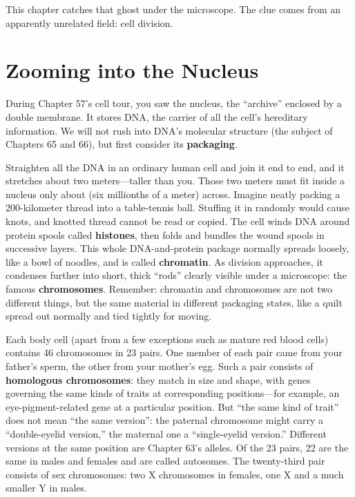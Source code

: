This chapter catches that ghost under the microscope. The clue comes from an apparently unrelated field: cell division.

\section{Zooming into the Nucleus}

During Chapter 57's cell tour, you saw the nucleus, the ``archive'' enclosed by a double membrane. It stores DNA, the carrier of all the cell's hereditary information. We will not rush into DNA's molecular structure (the subject of Chapters 65 and 66), but first consider its \textbf{packaging}.

Straighten all the DNA in an ordinary human cell and join it end to end, and it stretches about two meters---taller than you. Those two meters must fit inside a nucleus only about  (six millionths of a meter) across. Imagine neatly packing a 200-kilometer thread into a table-tennis ball. Stuffing it in randomly would cause knots, and knotted thread cannot be read or copied. The cell winds DNA around protein spools called \textbf{histones}, then folds and bundles the wound spools in successive layers. This whole DNA-and-protein package normally spreads loosely, like a bowl of noodles, and is called \textbf{chromatin}. As division approaches, it condenses further into short, thick ``rods'' clearly visible under a microscope: the famous \textbf{chromosomes}. Remember: chromatin and chromosomes are not two different things, but the same material in different packaging states, like a quilt spread out normally and tied tightly for moving.

Each body cell (apart from a few exceptions such as mature red blood cells) contains 46 chromosomes in 23 pairs. One member of each pair came from your father's sperm, the other from your mother's egg. Such a pair consists of \textbf{homologous chromosomes}: they match in size and shape, with genes governing the same kinds of traits at corresponding positions---for example, an eye-pigment-related gene at a particular position. But ``the same kind of trait'' does not mean ``the same version'': the paternal chromosome might carry a ``double-eyelid version,'' the maternal one a ``single-eyelid version.'' Different versions at the same position are Chapter 63's alleles. Of the 23 pairs, 22 are the same in males and females and are called autosomes. The twenty-third pair consists of sex chromosomes: two X chromosomes in females, one X and a much smaller Y in males.

